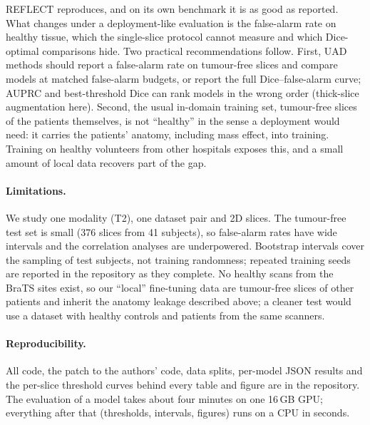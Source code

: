REFLECT reproduces, and on its own benchmark it is as good as reported.
What changes under a deployment-like evaluation is the false-alarm rate on healthy tissue, which the single-slice protocol cannot measure and which Dice-optimal comparisons hide.
Two practical recommendations follow.
First, UAD methods should report a false-alarm rate on tumour-free slices and compare models at matched false-alarm budgets, or report the full Dice--false-alarm curve; AUPRC and best-threshold Dice can rank models in the wrong order (thick-slice augmentation here).
Second, the usual in-domain training set, tumour-free slices of the patients themselves, is not ``healthy'' in the sense a deployment would need: it carries the patients' anatomy, including mass effect, into training.
Training on healthy volunteers from other hospitals exposes this, and a small amount of local data recovers part of the gap.

\paragraph{Limitations.}
We study one modality (T2), one dataset pair and 2D slices.
The tumour-free test set is small (376 slices from 41 subjects), so false-alarm rates have wide intervals and the correlation analyses are underpowered.
Bootstrap intervals cover the sampling of test subjects, not training randomness; repeated training seeds are reported in the repository as they complete.
No healthy scans from the BraTS sites exist, so our ``local'' fine-tuning data are tumour-free slices of other patients and inherit the anatomy leakage described above; a cleaner test would use a dataset with healthy controls and patients from the same scanners.

\paragraph{Reproducibility.}
All code, the patch to the authors' code, data splits, per-model JSON results and the per-slice threshold curves behind every table and figure are in the repository.
The evaluation of a model takes about four minutes on one 16\,GB GPU; everything after that (thresholds, intervals, figures) runs on a CPU in seconds.
